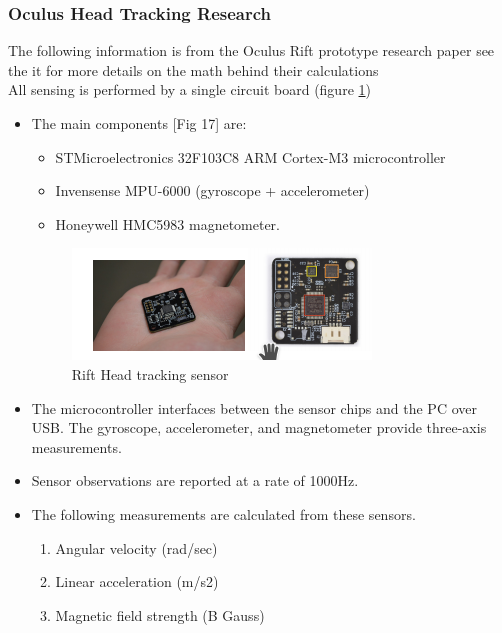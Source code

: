 \documentclass[a4paper,10pt]{article}
\begin{document}
\subsubsection{Oculus Head Tracking Research}
The following information is from the Oculus Rift prototype research paper see the it for more details on the math behind their calculations \cite{riftPaper}~\\
All sensing is performed by a single circuit board (figure \ref{fig:magnetsHowDoTheyWork}) 
\begin{itemize}
\item The main components [Fig 17] are:
\begin{itemize}
\item STMicroelectronics 32F103C8 ARM Cortex-M3 microcontroller
\item Invensense MPU-6000 (gyroscope + accelerometer)
\item Honeywell HMC5983 magnetometer.
\end{itemize}
\begin{figure}[H]
	\centerline{\includegraphics[]{riftMagnets.png}}
	\caption{Rift Head tracking sensor}
	\label{fig:magnetsHowDoTheyWork}
	\end{figure}
	

\item The microcontroller interfaces between the sensor chips
and the PC over USB. The gyroscope, accelerometer, and magnetometer provide three-axis measurements.

\item Sensor observations are reported at a rate of 1000Hz.
\item The following measurements are calculated from these sensors.
  \begin{enumerate}
  \item Angular velocity (rad/sec)
  \item Linear acceleration (m/s2)
  \item Magnetic field strength (B Gauss)
  \end{enumerate}
\end{itemize}
\end{document}
